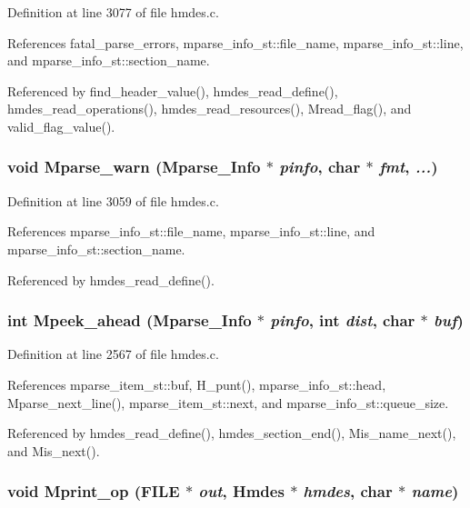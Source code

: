 Definition at line 3077 of file hmdes.c.

References fatal\_\-parse\_\-errors, mparse\_\-info\_\-st::file\_\-name, mparse\_\-info\_\-st::line, and mparse\_\-info\_\-st::section\_\-name.

Referenced by find\_\-header\_\-value(), hmdes\_\-read\_\-define(), hmdes\_\-read\_\-operations(), hmdes\_\-read\_\-resources(), Mread\_\-flag(), and valid\_\-flag\_\-value().
\subsubsection{\setlength{\rightskip}{0pt plus 5cm}void Mparse\_\-warn (\bf{Mparse\_\-Info} $\ast$ {\em pinfo}, char $\ast$ {\em fmt},  {\em ...})}\label{hmdes_8h_d75289a172681118dcf3d2dc27779d8f}




Definition at line 3059 of file hmdes.c.

References mparse\_\-info\_\-st::file\_\-name, mparse\_\-info\_\-st::line, and mparse\_\-info\_\-st::section\_\-name.

Referenced by hmdes\_\-read\_\-define().
\subsubsection{\setlength{\rightskip}{0pt plus 5cm}int Mpeek\_\-ahead (\bf{Mparse\_\-Info} $\ast$ {\em pinfo}, int {\em dist}, char $\ast$ {\em buf})}\label{hmdes_8h_d1b202220f173d1a1cf133ed53e7de09}




Definition at line 2567 of file hmdes.c.

References mparse\_\-item\_\-st::buf, H\_\-punt(), mparse\_\-info\_\-st::head, Mparse\_\-next\_\-line(), mparse\_\-item\_\-st::next, and mparse\_\-info\_\-st::queue\_\-size.

Referenced by hmdes\_\-read\_\-define(), hmdes\_\-section\_\-end(), Mis\_\-name\_\-next(), and Mis\_\-next().
\subsubsection{\setlength{\rightskip}{0pt plus 5cm}void Mprint\_\-op (FILE $\ast$ {\em out}, \bf{Hmdes} $\ast$ {\em hmdes}, char $\ast$ {\em name})}\label{hmdes_8h_009c16532ab5e1731f3a41830e88f47d}




